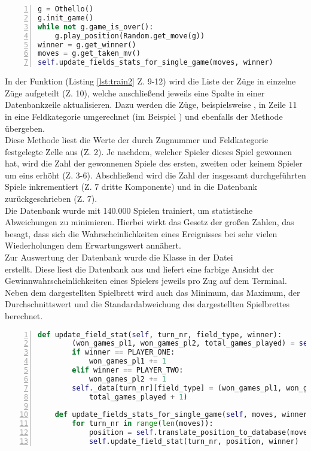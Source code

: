 \begin{lstlisting}[basicstyle=\footnotesize, caption = {Befüllen der Datenbank 1}, language = python, captionpos = t , numbers=left, label={lst:train1}]
g = Othello()
g.init_game()
while not g.game_is_over():
	g.play_position(Random.get_move(g))
winner = g.get_winner()
moves = g.get_taken_mv()
self.update_fields_stats_for_single_game(moves, winner)
\end{lstlisting}
In der Funktion  (Listing \ref{lst:train2} Z. 9-12) wird die Liste der Züge in einzelne Züge aufgeteilt (Z. 10), welche anschließend jeweils eine Spalte in einer Datenbankzeile aktualisieren. Dazu werden die Züge, beispielsweise , in Zeile 11 in eine Feldkategorie umgerechnet (im Beispiel ) und ebenfalls der Methode  übergeben.
\\Diese Methode liest die Werte der durch Zugnummer und Feldkategorie festgelegte Zelle aus (Z. 2). Je nachdem, welcher Spieler dieses Spiel gewonnen hat, wird die Zahl der gewonnenen Spiele des ersten, zweiten oder keinem Spieler um eins erhöht (Z. 3-6). Abschließend wird die Zahl der insgesamt durchgeführten Spiele inkrementiert (Z. 7 dritte Komponente) und in die Datenbank zurückgeschrieben (Z. 7).
\\Die Datenbank wurde mit 140.000 Spielen trainiert, um statistische Abweichungen zu minimieren. Hierbei wirkt das Gesetz der großen Zahlen, das besagt, dass sich die Wahrscheinlichkeiten eines Ereignisses bei sehr vielen Wiederholungen dem Erwartungswert annähert.
\\Zur Auswertung der Datenbank wurde die Klasse  in der Datei \\ erstellt. Diese liest die Datenbank aus und liefert eine farbige Ansicht der Gewinnwahrscheinlichkeiten eines Spielers jeweils pro Zug auf dem Terminal. Neben dem dargestellten Spielbrett wird auch das Minimum, das Maximum, der Durchschnittswert und die Standardabweichung des dargestellten Spielbrettes berechnet.
\begin{lstlisting}[basicstyle=\footnotesize, caption = {Befüllen der Datenbank 2}, language = python, captionpos = t , numbers=left, label={lst:train2}]
	def update_field_stat(self, turn_nr, field_type, winner):
		(won_games_pl1, won_games_pl2, total_games_played) = self._data[turn_nr][field_type]
		if winner == PLAYER_ONE:
			won_games_pl1 += 1
		elif winner == PLAYER_TWO:
			won_games_pl2 += 1
		self._data[turn_nr][field_type] = (won_games_pl1, won_games_pl2, 
			total_games_played + 1)

	def update_fields_stats_for_single_game(self, moves, winner):
		for turn_nr in range(len(moves)):
			position = self.translate_position_to_database(moves[turn_nr])
			self.update_field_stat(turn_nr, position, winner)
\end{lstlisting}

